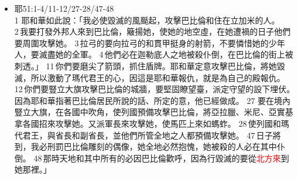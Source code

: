 \begin{itemize}
29 「招集一切弓箭手來攻擊巴比倫，要在巴比倫四圍安營，不要容一人逃脫，照著她所做的報應她。她怎樣待人，也要怎樣待她，因為她向耶和華以色列的聖者發了狂傲。
41 「看哪，有一種民從\textcolor{red}{北方而來}，並有一大國和許多君王被激動，從地極來到。 42 他們拿弓和槍，性情殘忍，不施憐憫，他們的聲音像海浪砰訇。巴比倫城(女子)啊，他們騎馬，都擺隊伍，如上戰場的人，要攻擊你。 
44 仇敵必像獅子從約旦河邊的叢林上來，攻擊堅固的居所。
\item 耶51:1-4/11-12/27-28/47-48\\
1 耶和華如此說：「我必使毀滅的風颳起，攻擊巴比倫和住在立加米的人。 2 我要打發外邦人來到巴比倫，簸揚她，使她的地空虛，在她遭禍的日子他們要周圍攻擊她。 3 拉弓的要向拉弓的和貫甲挺身的射箭，不要憐惜她的少年人，要滅盡她的全軍。 4 他們必在迦勒底人之地被殺仆倒，在巴比倫的街上被刺透。」
11 你們要磨尖了箭頭，抓住盾牌。耶和華定意攻擊巴比倫，將她毀滅，所以激動了瑪代君王的心，因這是耶和華報仇，就是為自己的殿報仇。 12 你們要豎立大旗攻擊巴比倫的城牆，要堅固瞭望臺，派定守望的設下埋伏。因為耶和華指著巴比倫居民所說的話、所定的意，他已經做成。 
27 要在境內豎立大旗，在各國中吹角，使列國預備攻擊巴比倫，將亞拉臘、米尼、亞實基拿各國招來攻擊她。又派軍長來攻擊她，使馬匹上來如螞蚱。 28 使列國和瑪代君王，與省長和副省長，並他們所管全地之人都預備攻擊她。 
47 日子將到，我必刑罰巴比倫雕刻的偶像，她全地必然抱愧，她被殺的人必在其中仆倒。 48 那時天地和其中所有的必因巴比倫歡呼，因為行毀滅的要從\textcolor{red}{北方來}到她那裡。」
\end{itemize}




